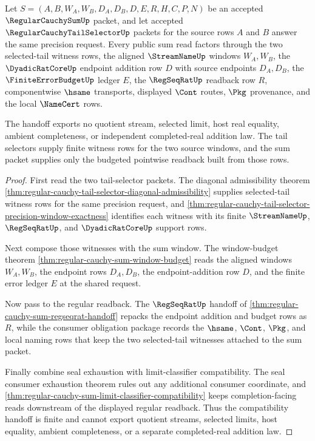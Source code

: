 \begin{theorem}
\label{thm:regular-cauchy-sum-tail-selector-compatibility}
Let $S=(A,B,W_A,W_B,D_A,D_B,D,E,R,H,C,P,N)$ be an accepted $\RegularCauchySumUp$ packet, and let accepted $\RegularCauchyTailSelectorUp$ packets for the source rows $A$ and $B$ answer the same precision request. Every public sum read factors through the two selected-tail witness rows, the aligned $\StreamNameUp$ windows $W_A,W_B$, the $\DyadicRatCoreUp$ endpoint addition row $D$ with source endpoints $D_A,D_B$, the $\FiniteErrorBudgetUp$ ledger $E$, the $\RegSeqRatUp$ readback row $R$, componentwise $\hsame$ transports, displayed $\Cont$ routes, $\Pkg$ provenance, and the local $\NameCert$ rows.

The handoff exports no quotient stream, selected limit, host real equality, ambient completeness, or independent completed-real addition law. The tail selectors supply finite witness rows for the two source windows, and the sum packet supplies only the budgeted pointwise readback built from those rows.
\end{theorem}
\begin{proof}
First read the two tail-selector packets. The diagonal admissibility theorem \autoref{thm:regular-cauchy-tail-selector-diagonal-admissibility} supplies selected-tail witness rows for the same precision request, and \autoref{thm:regular-cauchy-tail-selector-precision-window-exactness} identifies each witness with its finite $\StreamNameUp$, $\RegSeqRatUp$, and $\DyadicRatCoreUp$ support rows.

Next compose those witnesses with the sum window. The window-budget theorem \autoref{thm:regular-cauchy-sum-window-budget} reads the aligned windows $W_A,W_B$, the endpoint rows $D_A,D_B$, the endpoint-addition row $D$, and the finite error ledger $E$ at the shared request.

Now pass to the regular readback. The $\RegSeqRatUp$ handoff of \autoref{thm:regular-cauchy-sum-regseqrat-handoff} repacks the endpoint addition and budget rows as $R$, while the consumer obligation package records the $\hsame$, $\Cont$, $\Pkg$, and local naming rows that keep the two selected-tail witnesses attached to the sum packet.

Finally combine seal exhaustion with limit-classifier compatibility. The seal consumer exhaustion theorem rules out any additional consumer coordinate, and \autoref{thm:regular-cauchy-sum-limit-classifier-compatibility} keeps completion-facing reads downstream of the displayed regular readback. Thus the compatibility handoff is finite and cannot export quotient streams, selected limits, host equality, ambient completeness, or a separate completed-real addition law.
\end{proof}

